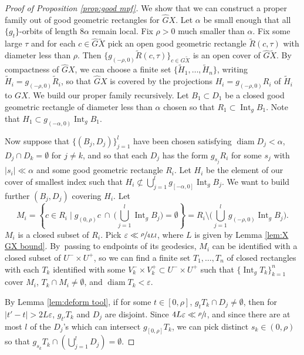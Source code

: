 \documentclass[10pt]{amsart}
\let\epsilon\varepsilon
\let\sep\mid
\theoremstyle{definition}
\numberwithin{equation}{section}
\DeclareMathOperator{\diam}{diam}
\DeclareMathOperator{\Int}{Int}
\begin{document}
\begin{proof}[Proof of Proposition \ref{prop:good mpf}]
We show that we can construct a proper family out of good geometric rectangles for $\hat G X$.
Let $\alpha$ be small enough that all $\{g_t\}$-orbits of length $8\alpha$ remain local. Fix $\rho>0$ much smaller than $\alpha$. Fix some large $\tau$ and for each $c \in \hat G\tilde X$ pick an open good geometric rectangle $\tilde R(c,\tau)$ with diameter less than $\rho$. Then $\{ g_{(-\rho,0)} \tilde R(c, \tau)\}_{c\in G\tilde X}$ is an open cover of $\hat G\tilde X$. By compactness of $\hat GX$, we can choose a finite set $\{ \tilde H_1, \ldots, \tilde H_n\}$, writing $\tilde H_i = g_{(-\rho,0)}\tilde R_i$, so that $\hat GX$ is covered by the projections $H_i= g_{(-\rho,0)} R_i$ of $\tilde H_i$ to $GX$. We build our proper family recursively. Let $B_1 \subset D_1$ be a closed good geometric rectangle of diameter less than $\alpha$ chosen so that $R_1 \subset \Int_g B_1$. Note that $H_1 \subset g_{(-\alpha,0)} \Int_g B_1$.

Now suppose that $\{ (B_j, D_j) \}_{j=1}^l$ have been chosen satisfying $\diam D_j < \alpha$, \hbox{$D_j \cap D_k = \emptyset$} for $j\neq k$, and so that each $D_j$ has the form $g_{s_j}R_i$ for some $s_j$ with $|s_i| \ll  \alpha$ and some good geometric rectangle $R_i$. Let $H_i$ be the element of our cover of smallest index such that $H_i \not\subset \bigcup_{j=1}^l g_{[-\alpha,0]} \Int_g B_j$.
We want to build further $(B_j, D_j)$ covering $H_i$. Let\vspace*{-3pt}\enlargethispage{\baselineskip}%
\[\textstyle
M_i = \left\{ c\in R_i \sep g_{(0,\rho)} c \ \cap \ \big(\bigcup_{j=1}^l \Int_g B_j\big) = \emptyset \right\}
= R_i \setminus \bigl( \bigcup_{j=1}^l g_{(-\rho,0)} \Int_g B_j \bigr).
\]
$M_i$ is a closed subset of $R_i$. Pick $\epsilon \ll  \sfrac{\rho}{4Ll}$, where $L$ is given by Lemma \ref{lem:X GX bound}. By~passing to endpoints of its geodesics, $M_i$ can be identified with a closed subset of $U^-\times U^+$, so we can find a finite set $T_1, \ldots, T_n$ of closed rectangles with each $T_k$ identified with some $V_k^-\times V_k^+ \subset U^-\times U^+$ such that $\{ \Int_g T_k\}_{k=1}^n$ cover $M_i$, $T_k \cap M_i \neq \emptyset$, and $\diam T_k < \epsilon$.

By Lemma \ref{lem:deform tool}, if for some $t\in [0,\rho]$, $g_tT_k \cap D_j \neq \emptyset$, then for $|t'-t|>2L\epsilon$, $g_{t'}T_k$ and $D_j$ are disjoint. Since $4L\epsilon \ll  \sfrac{\rho}{l}$, and since there are at most $l$ of the $D_j$'s which can intersect $g_{[0,\rho]}T_k$, we can pick distinct $s_k \in (0, \rho)$ so that $g_{s_k} T_k \cap ( \bigcup _{j=1}^l D_j ) = \emptyset$.


\end{proof}
\end{document}
